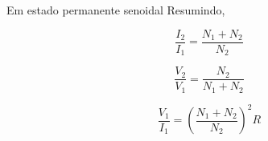 \documentclass[mathserif,usenames,dvipsnames]{beamer}
\begin{document}
\begin{frame}
\begin{overprint}
{			\begin{block}{Em estado permanente senoidal}
				Resumindo, \\
				\begin{minipage}[b]{0.45\linewidth}
					\begin{equation}\label{key} \tag{18}					
					\frac{{{I_2}}}{{{I_1}}} = \frac{{{N_1} + {N_2}}}{{{N_2}}}
					\end{equation}
				\end{minipage}
				\hfill
				\begin{minipage}[b]{0.45\linewidth}
					\begin{equation}\label{key} \tag{20}
					\frac{{{V_2}}}{{{V_1}}} = \frac{{{N_2}}}{{{N_1} + {N_2}}}
					\end{equation}
				\end{minipage}
				\begin{equation}\label{key} \tag{21}					
				\frac{{{V_1}}}{{{I_1}}} = {\left( {\frac{{{N_1} + {N_2}}}{{{N_2}}}} \right)^2}R
				\end{equation}
			\end{block}
		}
	\end{overprint}
\end{frame}
\end{document}
